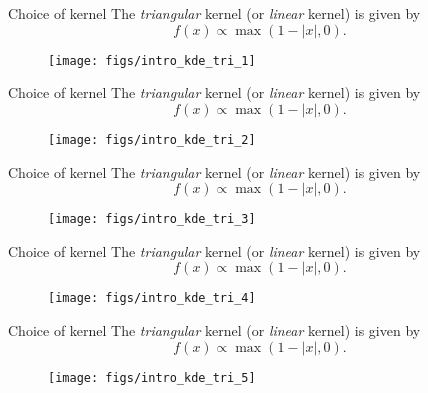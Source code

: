 \documentclass[11pt, aspectratio=149]{beamer}
\theoremstyle{plain}
\begin{document}
\begin{frame}[fragile, t]{Choice of kernel}
	The \emph{triangular} kernel (or \emph{linear} kernel) is given by
	\begin{equation*}
	f(x) \propto \max(1 - |x|, 0).
	\end{equation*}
	\vfill
	\begin{figure}
		\centering
		\texttt{[image: figs/intro\_kde\_tri\_1]}
	\end{figure}
\end{frame}


\begin{frame}[fragile, t]{Choice of kernel}
	The \emph{triangular} kernel (or \emph{linear} kernel) is given by
	\begin{equation*}
	f(x) \propto \max(1 - |x|, 0).
	\end{equation*}
	\vfill
	\begin{figure}
		\centering
		\texttt{[image: figs/intro\_kde\_tri\_2]}
	\end{figure}
\end{frame}


\begin{frame}[fragile, t]{Choice of kernel}
	The \emph{triangular} kernel (or \emph{linear} kernel) is given by
	\begin{equation*}
	f(x) \propto \max(1 - |x|, 0).
	\end{equation*}
	\vfill
	\begin{figure}
		\centering
		\texttt{[image: figs/intro\_kde\_tri\_3]}
	\end{figure}
\end{frame}


\begin{frame}[fragile, t]{Choice of kernel}
	The \emph{triangular} kernel (or \emph{linear} kernel) is given by
	\begin{equation*}
	f(x) \propto \max(1 - |x|, 0).
	\end{equation*}
	\vfill
	\begin{figure}
		\centering
		\texttt{[image: figs/intro\_kde\_tri\_4]}
	\end{figure}
\end{frame}


\begin{frame}[fragile, t]{Choice of kernel}
	The \emph{triangular} kernel (or \emph{linear} kernel) is given by
	\begin{equation*}
	f(x) \propto \max(1 - |x|, 0).
	\end{equation*}
	\vfill
	\begin{figure}
		\centering
		\texttt{[image: figs/intro\_kde\_tri\_5]}
	\end{figure}
\end{frame}
\end{document}
